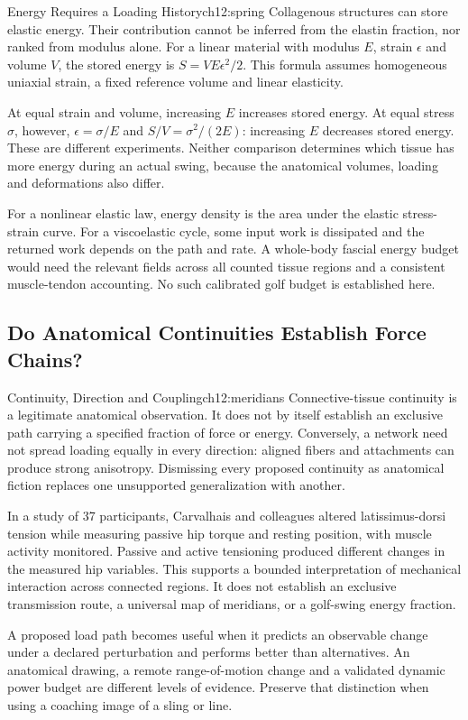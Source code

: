 \begin{mythreality}{Energy Requires a Loading History}{ch12:spring}
Collagenous structures can store elastic energy. Their contribution cannot be inferred from the elastin fraction, nor ranked from modulus alone. For a linear material with modulus $E$, strain $\epsilon$ and volume $V$, the stored energy is $S=VE\epsilon^2/2$. This formula assumes homogeneous uniaxial strain, a fixed reference volume and linear elasticity.

At equal strain and volume, increasing $E$ increases stored energy. At equal stress $\sigma$, however, $\epsilon=\sigma/E$ and $S/V=\sigma^2/(2E)$: increasing $E$ decreases stored energy. These are different experiments. Neither comparison determines which tissue has more energy during an actual swing, because the anatomical volumes, loading and deformations also differ.

For a nonlinear elastic law, energy density is the area under the elastic stress-strain curve. For a viscoelastic cycle, some input work is dissipated and the returned work depends on the path and rate. A whole-body fascial energy budget would need the relevant fields across all counted tissue regions and a consistent muscle-tendon accounting. No such calibrated golf budget is established here.
\end{mythreality}

\subsection{Do Anatomical Continuities Establish Force Chains?}

\begin{mythreality}{Continuity, Direction and Coupling}{ch12:meridians}
Connective-tissue continuity is a legitimate anatomical observation. It does not by itself establish an exclusive path carrying a specified fraction of force or energy. Conversely, a network need not spread loading equally in every direction: aligned fibers and attachments can produce strong anisotropy. Dismissing every proposed continuity as anatomical fiction replaces one unsupported generalization with another.

In a study of 37 participants, Carvalhais and colleagues altered latissimus-dorsi tension while measuring passive hip torque and resting position, with muscle activity monitored. Passive and active tensioning produced different changes in the measured hip variables. This supports a bounded interpretation of mechanical interaction across connected regions. It does not establish an exclusive transmission route, a universal map of meridians, or a golf-swing energy fraction. \citep{fasciaCarvalhais2013}

A proposed load path becomes useful when it predicts an observable change under a declared perturbation and performs better than alternatives. An anatomical drawing, a remote range-of-motion change and a validated dynamic power budget are different levels of evidence. Preserve that distinction when using a coaching image of a sling or line.
\end{mythreality}

